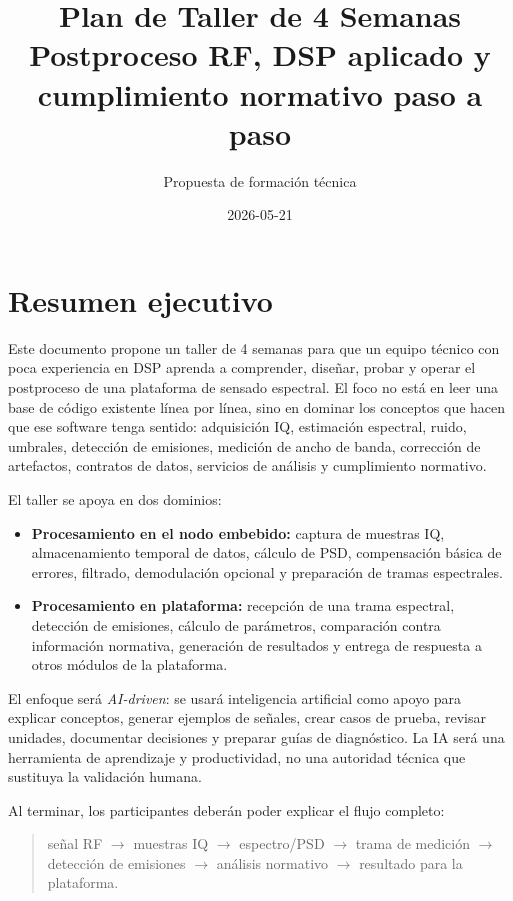 \documentclass[11pt,a4paper]{article}
\title{\textbf{Plan de Taller de 4 Semanas}\\
\large Postproceso RF, DSP aplicado y cumplimiento normativo paso a paso}
\author{Propuesta de formación técnica}
\date{2026-05-21}
\newcommand{\aidriven}{\textit{AI-driven}}
\begin{document}
\maketitle

\section*{Resumen ejecutivo}

Este documento propone un taller de 4 semanas para que un equipo técnico con poca experiencia en DSP aprenda a comprender, diseñar, probar y operar el postproceso de una plataforma de sensado espectral. El foco no está en leer una base de código existente línea por línea, sino en dominar los conceptos que hacen que ese software tenga sentido: adquisición IQ, estimación espectral, ruido, umbrales, detección de emisiones, medición de ancho de banda, corrección de artefactos, contratos de datos, servicios de análisis y cumplimiento normativo.

El taller se apoya en dos dominios:

\begin{itemize}
  \item \textbf{Procesamiento en el nodo embebido:} captura de muestras IQ, almacenamiento temporal de datos, cálculo de PSD, compensación básica de errores, filtrado, demodulación opcional y preparación de tramas espectrales.
  \item \textbf{Procesamiento en plataforma:} recepción de una trama espectral, detección de emisiones, cálculo de parámetros, comparación contra información normativa, generación de resultados y entrega de respuesta a otros módulos de la plataforma.
\end{itemize}

El enfoque será \aidriven: se usará inteligencia artificial como apoyo para explicar conceptos, generar ejemplos de señales, crear casos de prueba, revisar unidades, documentar decisiones y preparar guías de diagnóstico. La IA será una herramienta de aprendizaje y productividad, no una autoridad técnica que sustituya la validación humana.

Al terminar, los participantes deberán poder explicar el flujo completo:

\begin{quote}
señal RF $\rightarrow$ muestras IQ $\rightarrow$ espectro/PSD $\rightarrow$ trama de medición $\rightarrow$ detección de emisiones $\rightarrow$ análisis normativo $\rightarrow$ resultado para la plataforma.
\end{quote}
\end{document}
